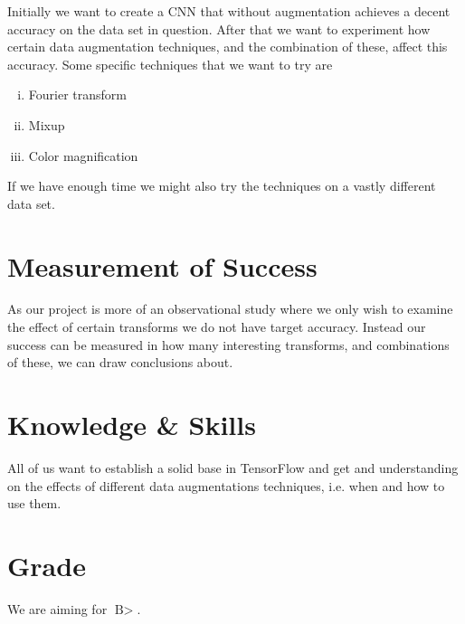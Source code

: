 \documentclass{article}
\begin{document}
Initially we want to create a CNN that without augmentation achieves a decent accuracy on the data set in question. After that we want to experiment how certain data augmentation techniques, and the combination of these, affect this accuracy. Some specific techniques that we want to try are

\begin{enumerate}[(i)]
 \item Fourier transform
 \item Mixup
 \item Color magnification 
\end{enumerate}

If we have enough time we might also try the techniques on a vastly different data set.

\section{Measurement of Success}

As our project is more of an observational study where we only wish to examine the effect of certain transforms we do not have target accuracy. Instead our success can be measured in how many interesting transforms, and combinations of these, we can draw conclusions about.

\section{Knowledge \& Skills}

All of us want to establish a solid base in TensorFlow and get and understanding on the effects of different data augmentations techniques, i.e. when and how to use them.

\section{Grade}

We are aiming for $\text{B}>$.
\end{document}
